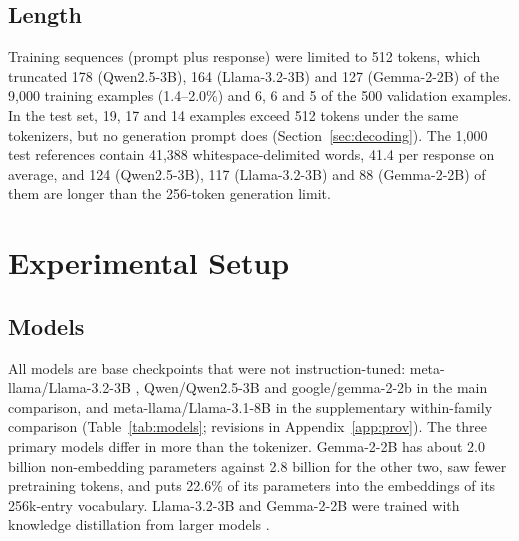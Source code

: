 \documentclass{article}
\begin{document}
\subsection{Length}

Training sequences (prompt plus response) were limited to 512 tokens, which truncated 178 (Qwen2.5-3B), 164 (Llama-3.2-3B) and 127 (Gemma-2-2B) of the 9,000 training examples (1.4–2.0\%) and 6, 6 and 5 of the 500 validation examples. In the test set, 19, 17 and 14 examples exceed 512 tokens under the same tokenizers, but no generation prompt does (Section~\ref{sec:decoding}). The 1,000 test references contain 41,388 whitespace-delimited words, 41.4 per response on average, and 124 (Qwen2.5-3B), 117 (Llama-3.2-3B) and 88 (Gemma-2-2B) of them are longer than the 256-token generation limit.

\section{Experimental Setup}\label{sec:setup}

\subsection{Models}\label{sec:models}

All models are base checkpoints that were not instruction-tuned: meta-llama/Llama-3.2-3B \citep{meta2024b}, Qwen/Qwen2.5-3B \citep{qwen2024} and google/gemma-2-2b \citep{gemma2024} in the main comparison, and meta-llama/Llama-3.1-8B \citep{grattafiori2024,meta2024a} in the supplementary within-family comparison (Table~\ref{tab:models}; revisions in Appendix~\ref{app:prov}). The three primary models differ in more than the tokenizer. Gemma-2-2B has about 2.0 billion non-embedding parameters against 2.8 billion for the other two, saw fewer pretraining tokens, and puts 22.6\% of its parameters into the embeddings of its 256k-entry vocabulary. Llama-3.2-3B and Gemma-2-2B were trained with knowledge distillation from larger models \citep{meta2024b,gemma2024}.
\end{document}
